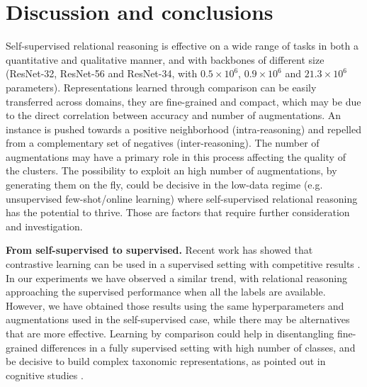 \documentclass{article}
\begin{document}
\section{Discussion and conclusions}\label{sec:discussion}

Self-supervised relational reasoning is effective on a wide range of tasks in both a quantitative and qualitative manner, and with backbones of different size (ResNet-32, ResNet-56 and ResNet-34, with $0.5 \times 10^{6}$, $0.9 \times 10^{6}$ and $21.3 \times 10^{6}$ parameters). 
Representations learned through comparison can be easily transferred across domains, they are fine-grained and compact, which may be due to the direct correlation between accuracy and number of augmentations. An instance is pushed towards a positive neighborhood (intra-reasoning) and repelled from a complementary set of negatives (inter-reasoning). The number of augmentations may have a primary role in this process affecting the quality of the clusters.
The possibility to exploit an high number of augmentations, by generating them on the fly, could be decisive in the low-data regime (e.g. unsupervised few-shot/online learning) where self-supervised relational reasoning has the potential to thrive. Those are factors that require further consideration and investigation.

\textbf{From self-supervised to supervised.} Recent work has showed that contrastive learning can be used in a supervised setting with competitive results \citep{prannay2020supervised}. In our experiments we have observed a similar trend, with relational reasoning approaching the supervised performance when all the labels are available. However, we have obtained those results using the same hyperparameters and augmentations used in the self-supervised case, while there may be alternatives that are more effective. Learning by comparison could help in disentangling fine-grained differences in a fully supervised setting with high number of classes, and be decisive to build complex taxonomic representations, as pointed out in cognitive studies \citep{gentner1999comparison, namy2002making}.
\end{document}
